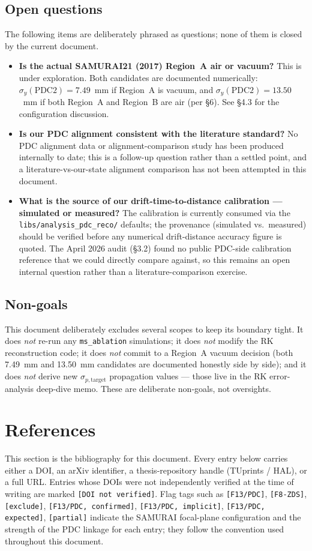 \documentclass[a4paper, 11pt]{article}
\begin{document}
\subsection{Open questions}
The following items are deliberately phrased as questions; none of them is closed by the current document.
\begin{itemize}
  \item \textbf{Is the actual SAMURAI21 (2017) Region~A air or vacuum?} This is under exploration. Both candidates are documented numerically: $\sigma_y(\text{PDC2}) = 7.49$~mm if Region~A is vacuum, and $\sigma_y(\text{PDC2}) = 13.50$~mm if both Region~A and Region~B are air (per §6). See §4.3 for the configuration discussion.
  \item \textbf{Is our PDC alignment consistent with the literature standard?} No PDC alignment data or alignment-comparison study has been produced internally to date; this is a follow-up question rather than a settled point, and a literature-vs-our-state alignment comparison has not been attempted in this document.
  \item \textbf{What is the source of our drift-time-to-distance calibration --- simulated or measured?} The calibration is currently consumed via the \texttt{libs/analysis\_pdc\_reco/} defaults; the provenance (simulated vs.\ measured) should be verified before any numerical drift-distance accuracy figure is quoted. The April 2026 audit (§3.2) found no public PDC-side calibration reference that we could directly compare against, so this remains an open internal question rather than a literature-comparison exercise.
\end{itemize}

\subsection{Non-goals}
This document deliberately excludes several scopes to keep its boundary tight. It does \emph{not} re-run any \texttt{ms\_ablation} simulations; it does \emph{not} modify the RK reconstruction code; it does \emph{not} commit to a Region~A vacuum decision (both 7.49~mm and 13.50~mm candidates are documented honestly side by side); and it does \emph{not} derive new $\sigma_{p,\text{target}}$ propagation values --- those live in the RK error-analysis deep-dive memo. These are deliberate non-goals, not oversights.

\section{References}
This section is the bibliography for this document. Every entry below carries either a DOI, an arXiv identifier, a thesis-repository handle (TUprints / HAL), or a full URL. Entries whose DOIs were not independently verified at the time of writing are marked \texttt{[DOI not verified]}. Flag tags such as \texttt{[F13/PDC]}, \texttt{[F8-ZDS]}, \texttt{[exclude]}, \texttt{[F13/PDC, confirmed]}, \texttt{[F13/PDC, implicit]}, \texttt{[F13/PDC, expected]}, \texttt{[partial]} indicate the SAMURAI focal-plane configuration and the strength of the PDC linkage for each entry; they follow the convention used throughout this document.
\end{document}
